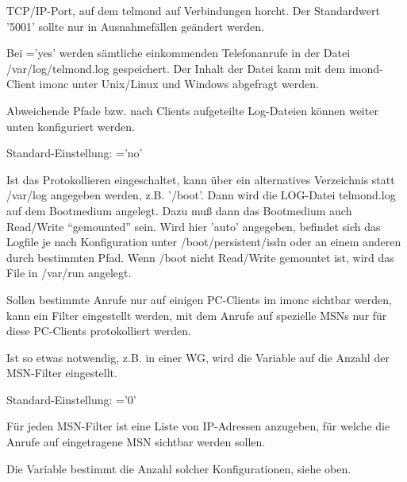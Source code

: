 \begin{description}

  
  TCP/IP-Port, auf dem telmond auf Verbindungen horcht.  Der
  Standardwert '5001' sollte nur in Ausnahmefällen geändert werden.


  
  Bei ='yes' werden sämtliche einkommenden Telefonanrufe
  in der Datei /var/log/telmond.log gespeichert. Der Inhalt der Datei
  kann mit dem imond-Client imonc unter Unix/Linux und Windows
  abgefragt werden.
  
  Abweichende Pfade bzw. nach Clients aufgeteilte Log-Dateien können
  weiter unten konfiguriert werden.
  
  Standard-Einstellung: ='no'

  
  Ist das Protokollieren eingeschaltet, kann über  ein
  alternatives Verzeichnis statt /var/log angegeben werden, z.B.
  '/boot'. Dann wird die LOG-Datei telmond.log auf dem Bootmedium
  angelegt. Dazu muß dann das Bootmedium auch Read/Write ``gemounted''
  sein. Wird hier 'auto' angegeben, befindet sich das Logfile je nach Konfiguration
  unter /boot/persistent/isdn oder an einem anderen durch  bestimmten
  Pfad. Wenn /boot nicht Read/Write gemountet ist, wird das File in /var/run angelegt.

  
  Sollen bestimmte Anrufe nur auf einigen PC-Clients im imonc sichtbar
  werden, kann ein Filter eingestellt werden, mit dem Anrufe auf
  spezielle MSNs nur für diese PC-Clients protokolliert werden.
  
  Ist so etwas notwendig, z.B. in einer WG, wird die Variable
   auf die Anzahl der MSN-Filter eingestellt.
  
  Standard-Einstellung: ='0'

  
  Für jeden MSN-Filter ist eine Liste von IP-Adressen anzugeben, für
  welche die Anrufe auf eingetragene MSN sichtbar werden sollen.
  
  Die Variable  bestimmt die Anzahl solcher
  Konfigurationen, siehe oben.
  

\end{description}
